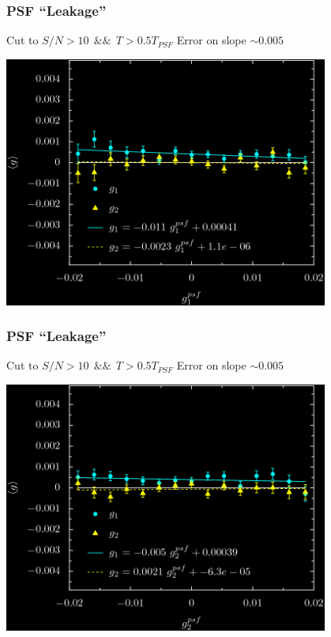 \documentclass{beamer}
\begin{document}
\frame
{
    \frametitle{PSF ``Leakage''}
 
   Cut to $S/N > 10~~ \&\&~~ T > 0.5 T_{PSF}$
   \newline
   Error on slope $\sim 0.005$


    \begin{center}
    \includegraphics[width=0.8\textwidth]{y3-ThalfTpsf-g1psf-inv.png}
    \end{center}


}

\frame
{
    \frametitle{PSF ``Leakage''}
 
   Cut to $S/N > 10 ~~ \&\& ~~ T > 0.5 T_{PSF}$
   \newline
   Error on slope $\sim 0.005$


    \begin{center}
    \includegraphics[width=0.8\textwidth]{y3-ThalfTpsf-g2psf-inv.png}
    \end{center}


}
\end{document}
